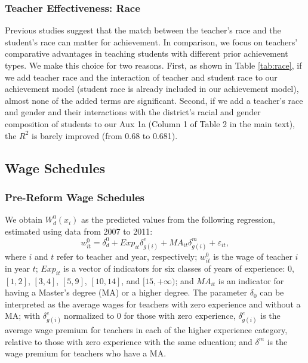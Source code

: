\documentclass[notitlepage,12pt]{article}%
\begin{document}
\subsubsection{Teacher Effectiveness: Race}

Previous studies suggest that the match between the teacher's race and the
student's race can matter for achievement. In comparison, we focus on
teachers' comparative advantages in teaching students with different prior
achievement types. We make this choice for two reasons. First, as shown in
Table \ref{tab:race}, if we add teacher race and the interaction of teacher
and student race to our achievement model (student race is already included in
our achievement model), almost none of the added terms are significant.
Second, if we add a teacher's race and gender and their interactions with the
district's racial and gender composition of students to our Aux 1a (Column 1
of Table 2 in the main text), the $R^{2}$ is barely improved (from 0.68 to 0.681).

\subsection{Wage Schedules}

\subsubsection{Pre-Reform Wage Schedules\label{pre}}

We obtain $W_{d}^{0}\left(  x_{i}\right)  $ as the predicted values from the
following regression, estimated using data from 2007 to 2011:
\begin{equation}
w_{it}^{0}=\delta_{d}^{0}+Exp_{it}\delta_{g(i)}^{e}+MA_{it}\delta_{g(i)}%
^{m}+\varepsilon_{it}, \label{w0}%
\end{equation}
where $i$ and $t$ refer to teacher and year, respectively; $w_{it}^{0}$ is the
wage of teacher $i$ in year $t$; $Exp_{it}$ is a vector of indicators for six
classes of years of experience: $0,$ $[1,2]$, $[3,4]$, $[5,9]$, $[10,14]$, and
$[15,+\infty)$; and $MA_{it}$ is an indicator for having a Master's degree
(MA) or a higher degree. The parameter $\delta_{0}$ can be interpreted as the
average wages for teachers with zero experience and without a MA; with
$\delta_{g(i)}^{e}\ $normalized to $0$ for those with zero experience,
$\delta_{g(i)}^{e}$ is the average wage premium for teachers in each of the
higher experience category, relative to those with zero experience with the
same education; and $\delta^{m}$ is the wage premium for teachers who have a MA.
\end{document}
